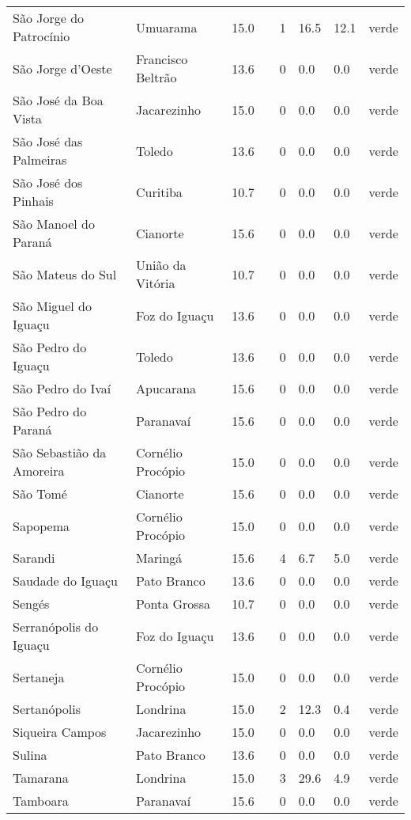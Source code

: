 \begin{longtable}{l|lllllll}
  São Jorge do Patrocínio & Umuarama & 15.0 &  & 1 & 16.5 & 12.1 & verde \\ 
  São Jorge d'Oeste & Francisco Beltrão & 13.6 &  & 0 & 0.0 & 0.0 & verde \\ 
  São José da Boa Vista & Jacarezinho & 15.0 &  & 0 & 0.0 & 0.0 & verde \\ 
  São José das Palmeiras & Toledo & 13.6 &  & 0 & 0.0 & 0.0 & verde \\ 
  São José dos Pinhais & Curitiba & 10.7 &  & 0 & 0.0 & 0.0 & verde \\ 
  São Manoel do Paraná & Cianorte & 15.6 &  & 0 & 0.0 & 0.0 & verde \\ 
  São Mateus do Sul & União da Vitória & 10.7 &  & 0 & 0.0 & 0.0 & verde \\ 
  São Miguel do Iguaçu & Foz do Iguaçu & 13.6 &  & 0 & 0.0 & 0.0 & verde \\ 
  São Pedro do Iguaçu & Toledo & 13.6 &  & 0 & 0.0 & 0.0 & verde \\ 
  São Pedro do Ivaí & Apucarana & 15.6 &  & 0 & 0.0 & 0.0 & verde \\ 
  São Pedro do Paraná & Paranavaí & 15.6 &  & 0 & 0.0 & 0.0 & verde \\ 
  São Sebastião da Amoreira & Cornélio Procópio & 15.0 &  & 0 & 0.0 & 0.0 & verde \\ 
  São Tomé & Cianorte & 15.6 &  & 0 & 0.0 & 0.0 & verde \\ 
  Sapopema & Cornélio Procópio & 15.0 &  & 0 & 0.0 & 0.0 & verde \\ 
  Sarandi & Maringá & 15.6 &  & 4 & 6.7 & 5.0 & verde \\ 
  Saudade do Iguaçu & Pato Branco & 13.6 &  & 0 & 0.0 & 0.0 & verde \\ 
  Sengés & Ponta Grossa & 10.7 &  & 0 & 0.0 & 0.0 & verde \\ 
  Serranópolis do Iguaçu & Foz do Iguaçu & 13.6 &  & 0 & 0.0 & 0.0 & verde \\ 
  Sertaneja & Cornélio Procópio & 15.0 &  & 0 & 0.0 & 0.0 & verde \\ 
  Sertanópolis & Londrina & 15.0 &  & 2 & 12.3 & 0.4 & verde \\ 
  Siqueira Campos & Jacarezinho & 15.0 &  & 0 & 0.0 & 0.0 & verde \\ 
  Sulina & Pato Branco & 13.6 &  & 0 & 0.0 & 0.0 & verde \\ 
  Tamarana & Londrina & 15.0 &  & 3 & 29.6 & 4.9 & verde \\ 
  Tamboara & Paranavaí & 15.6 &  & 0 & 0.0 & 0.0 & verde \\ 

\end{longtable}
